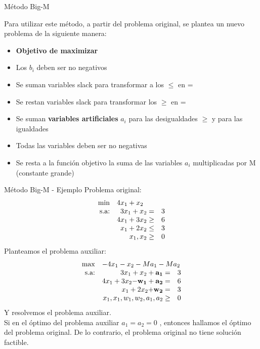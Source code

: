 \documentclass[10pt, aspectratio=169]{beamer}
\begin{document}
    \begin{frame}{Método Big-M}

        \label{slide1}
        Para utilizar este método, a partir del problema original, se plantea un nuevo problema de la siguiente manera:
        \begin{itemize}
            \item \textbf{Objetivo de maximizar}
            \item Los $b_i$ deben ser no negativos
            \item Se suman variables slack para transformar a los $\leq$ en =
            \item Se restan variables slack para transformar los $\geq$ en =
            \item Se suman \textbf{variables artificiales} $a_i$ para las desigualdades $\geq$ y para las igualdades
            \item Todas las variables deben ser no negativas
            \item Se resta a la función objetivo la suma de las variables $a_i$ multiplicadas por M (constante grande)
        \end{itemize}
    \end{frame}

    \begin{frame}{Método Big-M - Ejemplo}
        Problema original:
        \[
            \begin{array}{rrl}
                \min & \multicolumn{2}{l}{4x_1+x_2} \\
                \text{s.a:} & 3x_1+x_2 =     & 3 \\
                & 4x_1+3x_2 \geq & 6 \\
                & x_1+2x_2 \leq  & 3 \\
                & x_1,x_2\geq    & 0
            \end{array}
        \]
        Planteamos el problema auxiliar:
        \[
            \begin{array}{rrl}
                \max & \multicolumn{2}{l}{-4x_1-x_2-Ma_1-Ma_2} \\
                \text{s.a:} & 3x_1+x_2+\mathbf{a_1} =      & 3 \\
                & 4x_1+3x_2\mathbf{-w_1+a_2} = & 6 \\
                & x_1+2x_2\mathbf{+w_2} =      & 3 \\
                & x_1,x_1,w_1,w_2,a_1,a_2 \geq & 0
            \end{array}
        \]
        Y resolvemos el problema auxiliar.\\
        Si en el óptimo del problema auxiliar $a_1=a_2=0$
        , entonces hallamos el óptimo del problema original. De lo contrario, el problema original no tiene solución
        factible.
    \end{frame}
\end{document}
